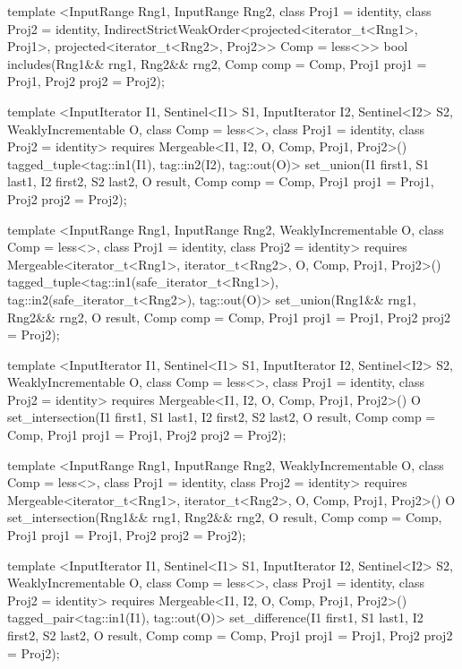\begin{codeblock}
{{{{  template <InputRange Rng1, InputRange Rng2, class Proj1 = identity,
      class Proj2 = identity,
      IndirectStrictWeakOrder<projected<iterator_t<Rng1>, Proj1>,
        projected<iterator_t<Rng2>, Proj2>> Comp = less<>>
    bool
      includes(Rng1&& rng1, Rng2&& rng2, Comp comp = Comp{},
               Proj1 proj1 = Proj1{}, Proj2 proj2 = Proj2{});

  template <InputIterator I1, Sentinel<I1> S1, InputIterator I2, Sentinel<I2> S2,
      WeaklyIncrementable O, class Comp = less<>, class Proj1 = identity, class Proj2 = identity>
    requires Mergeable<I1, I2, O, Comp, Proj1, Proj2>()
    tagged_tuple<tag::in1(I1), tag::in2(I2), tag::out(O)>
      set_union(I1 first1, S1 last1, I2 first2, S2 last2, O result, Comp comp = Comp{},
                Proj1 proj1 = Proj1{}, Proj2 proj2 = Proj2{});

  template <InputRange Rng1, InputRange Rng2, WeaklyIncrementable O,
      class Comp = less<>, class Proj1 = identity, class Proj2 = identity>
    requires Mergeable<iterator_t<Rng1>, iterator_t<Rng2>, O, Comp, Proj1, Proj2>()
    tagged_tuple<tag::in1(safe_iterator_t<Rng1>),
                 tag::in2(safe_iterator_t<Rng2>),
                 tag::out(O)>
      set_union(Rng1&& rng1, Rng2&& rng2, O result, Comp comp = Comp{},
                Proj1 proj1 = Proj1{}, Proj2 proj2 = Proj2{});

  template <InputIterator I1, Sentinel<I1> S1, InputIterator I2, Sentinel<I2> S2,
      WeaklyIncrementable O, class Comp = less<>, class Proj1 = identity, class Proj2 = identity>
    requires Mergeable<I1, I2, O, Comp, Proj1, Proj2>()
    O
      set_intersection(I1 first1, S1 last1, I2 first2, S2 last2, O result,
                       Comp comp = Comp{}, Proj1 proj1 = Proj1{}, Proj2 proj2 = Proj2{});

  template <InputRange Rng1, InputRange Rng2, WeaklyIncrementable O,
      class Comp = less<>, class Proj1 = identity, class Proj2 = identity>
    requires Mergeable<iterator_t<Rng1>, iterator_t<Rng2>, O, Comp, Proj1, Proj2>()
    O
      set_intersection(Rng1&& rng1, Rng2&& rng2, O result,
                       Comp comp = Comp{}, Proj1 proj1 = Proj1{}, Proj2 proj2 = Proj2{});

  template <InputIterator I1, Sentinel<I1> S1, InputIterator I2, Sentinel<I2> S2,
      WeaklyIncrementable O, class Comp = less<>, class Proj1 = identity, class Proj2 = identity>
    requires Mergeable<I1, I2, O, Comp, Proj1, Proj2>()
    tagged_pair<tag::in1(I1), tag::out(O)>
      set_difference(I1 first1, S1 last1, I2 first2, S2 last2, O result,
                     Comp comp = Comp{}, Proj1 proj1 = Proj1{}, Proj2 proj2 = Proj2{});

}}}}
\end{codeblock}

